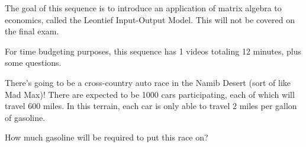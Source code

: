 






The goal of this sequence is to introduce an application of matrix algebra to economics, called the Leontief
Input-Output Model.  This will not be covered on the final exam.  


For time budgeting purposes, this sequence has 1 videos totaling 12 minutes, 
plus some questions.  




\endedxtext

\endedxvertical





There's going to be a cross-country auto race in the Namib Desert (sort of like Mad Max)!  There are expected to be
1000 cars participating, each of which will travel 600 miles.  In this terrain, each car is only
able to travel 2 miles per gallon of gasoline.
  
How much gasoline will be required to put this race on?  


 
\endedxproblem


\endedxvertical





\endedxvertical
